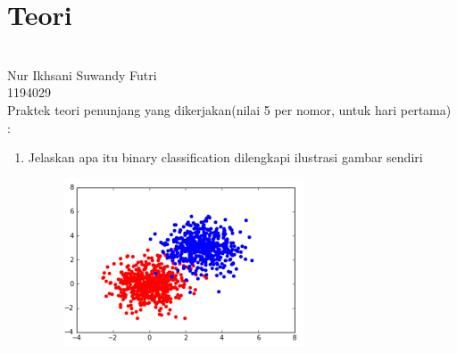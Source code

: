 \section{Teori}\\
Nur Ikhsani Suwandy Futri\\
1194029\\
Praktek teori penunjang yang dikerjakan(nilai 5 per nomor, untuk hari pertama) :
\begin{enumerate}
\item
Jelaskan apa itu binary classification dilengkapi ilustrasi gambar sendiri\\

\begin{figure}[!htbp]
		\centering
		\includegraphics[scale=0.4]{figures/chapter2/binary.png}
	\end{figure}
	 \newpage


\end{enumerate}
